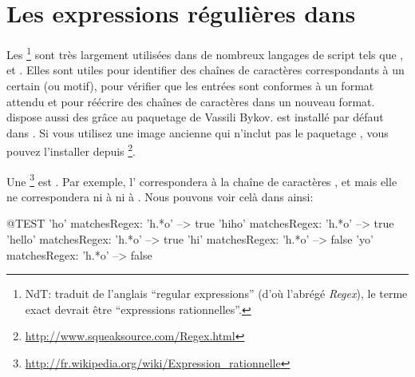 \documentclass[a4paper,10pt,twoside]{book}
\renewcommand{\nnbb}[2]{}
\begin{document}
\fi
\sloppy
\chapter{Les expressions régulières dans \pharo}


Les \expregs\footnote{NdT: traduit de l'anglais ``regular expressions''
  (d'où l'abrégé \emph{Regex}), le terme exact devrait être
  ``expressions rationnelles''.} sont très largement utilisées dans de
nombreux langages de script tels que ,  et
.
Elles sont utiles pour identifier des chaînes de caractères
correspondants à un certain \pattern (ou motif), pour vérifier que les
entrées sont conformes à un format attendu et pour réécrire des
chaînes de caractères dans un nouveau format.
\pharo dispose aussi des \expregs grâce au paquetage  de
Vassili Bykov.
\pkgregex est installé par défaut dans \pharo. Si vous utilisez une image
ancienne qui n'inclut pas le paquetage \pkgregex, vous pouvez
l'installer depuis \ind{\sqsrc}\footnote{\url{http://www.squeaksource.com/Regex.html}}.

Une \expreg\footnote{\url{http://fr.wikipedia.org/wiki/Expression_rationnelle}}
est .
Par exemple, l'\expreg  {} correspondera à la chaîne de
caractères ,  et  mais elle ne
correspondera ni à  ni à .
Nous pouvons voir celà dans \pharo ainsi:
\begin{code}{@TEST}
'ho' matchesRegex: 'h.*o'     --> true
'hiho' matchesRegex: 'h.*o'  --> true
'hello' matchesRegex: 'h.*o' --> true
'hi' matchesRegex: 'h.*o'      --> false
'yo' matchesRegex: 'h.*o'     --> false
\end{code}
\end{document}
